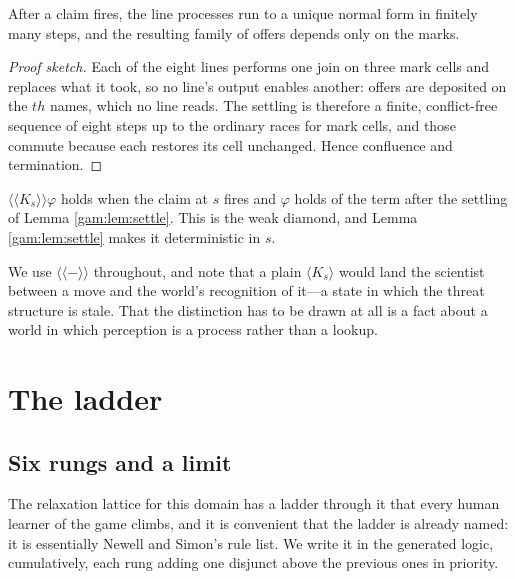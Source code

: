 \begin{lemma}\label{gam:lem:settle}
After a claim fires, the line processes run to a unique normal form in finitely
many steps, and the resulting family of offers depends only on the marks.
\end{lemma}
\begin{proof}[Proof sketch]
Each of the eight lines performs one join on three mark cells and replaces what
it took, so no line's output enables another: offers are deposited on the
$\mathit{th}$ names, which no line reads. The settling is therefore a finite,
conflict-free sequence of eight steps up to the ordinary races for mark cells,
and those commute because each restores its cell unchanged. Hence confluence and
termination.
\end{proof}

\begin{definition}\label{gam:settled-modality}
$\langle\!\langle K_s \rangle\!\rangle \varphi$ holds when the claim at $s$
fires and $\varphi$ holds of the term after the settling of Lemma
\ref{gam:lem:settle}. This is the weak diamond, and Lemma \ref{gam:lem:settle} makes it
deterministic in $s$.
\end{definition}

We use $\langle\!\langle - \rangle\!\rangle$ throughout, and note that a plain
$\langle K_s\rangle$ would land the scientist between a move and the world's
recognition of it---a state in which the threat structure is stale. That the
distinction has to be drawn at all is a fact about a world in which perception
is a process rather than a lookup.

\section{The ladder}\label{gam:sec:ladder}\label{gam:S5}

\subsection{Six rungs and a limit}\label{gam:S5.1}

The relaxation lattice for this domain has a ladder through it that every human
learner of the game climbs, and it is convenient that the ladder is already
named: it is essentially Newell and Simon's rule list. We write it in the
generated logic, cumulatively, each rung adding one disjunct above the previous
ones in priority.

